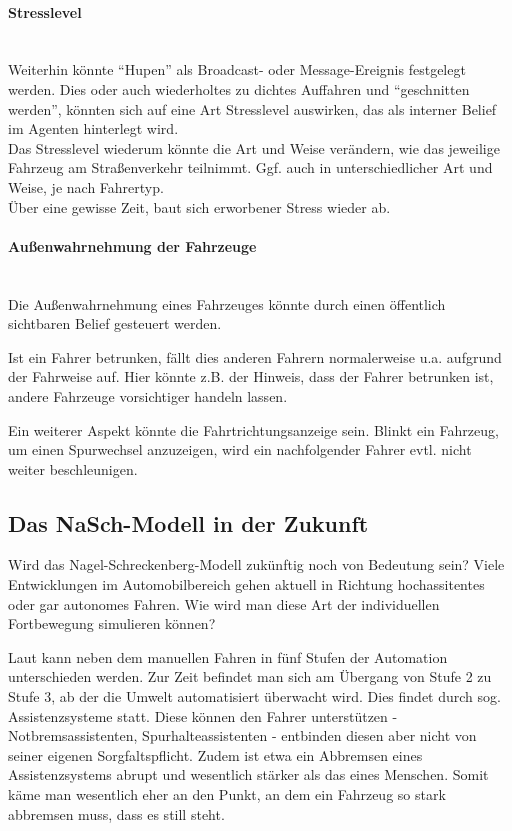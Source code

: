 \paragraph*{Stresslevel}
\hfill \\
Weiterhin könnte \enquote{Hupen} als Broadcast- oder Message-Ereignis festgelegt werden.
Dies oder auch wiederholtes zu dichtes Auffahren und \enquote{geschnitten werden}, könnten sich auf eine Art Stresslevel auswirken, das als interner Belief im Agenten hinterlegt wird.
\\
Das Stresslevel wiederum könnte die Art und Weise verändern, wie das jeweilige Fahrzeug am Straßenverkehr teilnimmt. 
Ggf. auch in unterschiedlicher Art und Weise, je nach Fahrertyp.
\\
Über eine gewisse Zeit, baut sich erworbener Stress wieder ab.

\paragraph*{Außenwahrnehmung der Fahrzeuge}
\hfill \\
Die Außenwahrnehmung eines Fahrzeuges könnte durch einen öffentlich sichtbaren Belief gesteuert werden. 

Ist ein Fahrer betrunken, fällt dies anderen Fahrern normalerweise u.a. aufgrund der Fahrweise auf.
Hier könnte z.B. der Hinweis, dass der Fahrer betrunken ist, andere Fahrzeuge vorsichtiger handeln lassen.

Ein weiterer Aspekt könnte die Fahrtrichtungsanzeige sein.
Blinkt ein Fahrzeug, um einen Spurwechsel anzuzeigen, wird ein nachfolgender Fahrer evtl. nicht weiter beschleunigen. 





\subsection{Das NaSch-Modell in der Zukunft}
Wird das Nagel-Schreckenberg-Modell zukünftig noch von Bedeutung sein? 
Viele Entwicklungen im Automobilbereich gehen aktuell in Richtung hochassitentes oder gar autonomes Fahren.
Wie wird man diese Art der individuellen Fortbewegung simulieren können?

Laut \cite{automation-level} kann neben dem manuellen Fahren in fünf Stufen der Automation unterschieden werden.
Zur Zeit befindet man sich am Übergang von Stufe 2 zu Stufe 3, ab der die Umwelt automatisiert überwacht wird.
Dies findet durch sog. Assistenzsysteme statt.
Diese können den Fahrer unterstützen - Notbremsassistenten, Spurhalteassistenten - entbinden diesen aber nicht von seiner eigenen Sorgfaltspflicht.
Zudem ist etwa ein Abbremsen eines Assistenzsystems abrupt und wesentlich stärker als das eines Menschen.
Somit käme man wesentlich eher an den Punkt, an dem ein Fahrzeug so stark abbremsen muss, dass es still steht.

